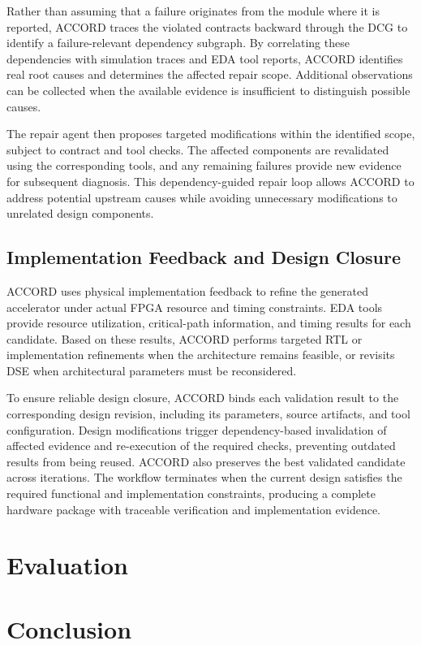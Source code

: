 \documentclass[conference]{IEEEtran}
\begin{document}
Rather than assuming that a failure originates from the module where it is reported, ACCORD traces the violated contracts backward through the DCG to identify a failure-relevant dependency subgraph. By correlating these dependencies with simulation traces and EDA tool reports, ACCORD identifies real root causes and determines the affected repair scope. Additional observations can be collected when the available evidence is insufficient to distinguish possible causes.

The repair agent then proposes targeted modifications within the identified scope, subject to contract and tool checks. The affected components are revalidated using the corresponding tools, and any remaining failures provide new evidence for subsequent diagnosis. This dependency-guided repair loop allows ACCORD to address potential upstream causes while avoiding unnecessary modifications to unrelated design components.

\subsection{Implementation Feedback and Design Closure}
ACCORD uses physical implementation feedback to refine the generated accelerator under actual FPGA resource and timing constraints. EDA tools provide resource utilization, critical-path information, and timing results for each candidate. Based on these results, ACCORD performs targeted RTL or implementation refinements when the architecture remains feasible, or revisits DSE when architectural parameters must be reconsidered.

To ensure reliable design closure, ACCORD binds each validation result to the corresponding design revision, including its parameters, source artifacts, and tool configuration. Design modifications trigger dependency-based invalidation of affected evidence and re-execution of the required checks, preventing outdated results from being reused. ACCORD also preserves the best validated candidate across iterations. The workflow terminates when the current design satisfies the required functional and implementation constraints, producing a complete hardware package with traceable verification and implementation evidence.


\section{Evaluation}


\section{Conclusion}



\vspace{12pt}
\clearpage
 
 
\end{document}
